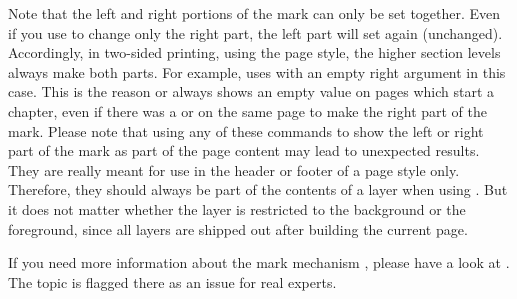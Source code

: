   Note that the left and right portions of the mark
  can only be set together. Even if you use
   to change only the
  right part, the left part will set again (unchanged). Accordingly, in
  two-sided printing, using the %
   page style,
  the higher section levels always make both parts. For example,
   uses  with
  an empty right argument in this case. This is the reason 
   or  always shows an
  empty value on pages which start a chapter, even if there was a
   or  on the
  same page to make the right part of the mark.
  Please note that using any of these commands to show
  the left or right part of the mark as part of the page content may lead to
  unexpected results. They are really meant for use in the header or footer 
  of a page style only. Therefore, they should always be part of the contents
  of a layer when using . But it does not matter whether the layer is restricted to the background
  or the foreground, since all layers are shipped out after building the
  current page.

  If you need more information about the mark mechanism 
  , please have a look at 
  \cite[chapter~23]{knuth:texbook}. The topic is flagged there as an issue for
  real experts. %
  \EndIndexGroup
\fi
  
  
%
  \begin{Declaration}
  \end{Declaration}


